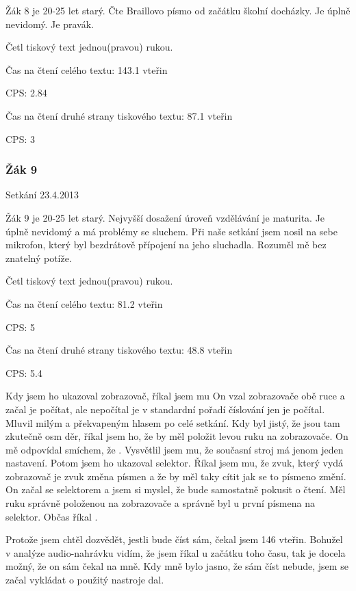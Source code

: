 Žák 8 je 20-25 let starý. Čte Braillovo písmo od začátku školní docházky. Je úplně nevidomý. Je pravák.

Četl tiskový text jednou(pravou) rukou.


Čas na čtení celého textu: 143.1 vteřin

CPS: 2.84

Čas na čtení druhé strany tiskového textu: 87.1  vteřin

CPS: 3


\subsubsection{Žák 9}
Setkání 23.4.2013

Žák 9 je 20-25 let starý.  Nejvyšší dosažení úroveň vzdělávání je maturita.  Je úplně nevidomý a má problémy se sluchem.  Při naše setkání jsem nosil na sebe mikrofon, který byl bezdrátově přípojení na jeho sluchadla.  Rozuměl mě bez znatelný potíže.

Četl tiskový text jednou(pravou) rukou.

Čas na čtení celého textu: 81.2 vteřin

CPS: 5

Čas na čtení druhé strany tiskového textu: 48.8 vteřin

CPS: 5.4

Kdy jsem ho ukazoval zobrazovač, říkal jsem mu  On vzal zobrazovače obě ruce a začal je počítat, ale nepočítal je v standardní pořadí číslování jen je počítal.  Mluvil milým a překvapeným hlasem po celé setkání. Kdy byl jistý, že jsou tam zkutečně osm děr, říkal jsem ho, že by měl položit levou ruku na zobrazovače.  On mě odpovídal smíchem, že . Vysvětlil jsem mu, že současní stroj má jenom jeden nastavení.  Potom jsem ho ukazoval selektor.  Říkal jsem mu, že zvuk, který vydá zobrazovač je zvuk změna písmen a že by měl taky cítit jak se to písmeno změní.  On začal  se selektorem a jsem si myslel, že bude samostatně pokusit o čtení.  Měl ruku správně položenou na zobrazovače a správně byl u první písmena na selektor.  Občas říkal .

Protože jsem chtěl dozvědět, jestli bude číst sám, čekal jsem 146 vteřin.  Bohužel v analýze audio-nahrávku vidím, že jsem říkal  u začátku toho času, tak je docela možný, že on sám čekal na mně.  Kdy mně bylo jasno, že sám číst nebude, jsem se začal vykládat o použitý nastroje dal.

